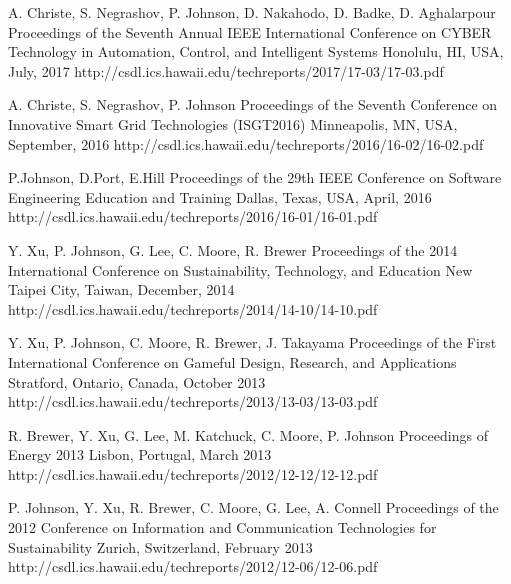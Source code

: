 \documentclass[11pt,letterpaper,sans]{moderncv} %
\begin{document}
          {A. Christe, S. Negrashov, P. Johnson, D. Nakahodo, D. Badke, D. Aghalarpour}
          {Proceedings of the Seventh Annual IEEE International Conference on CYBER Technology in Automation, Control, and Intelligent Systems}
          {Honolulu, HI, USA, July, 2017}
          {http://csdl.ics.hawaii.edu/techreports/2017/17-03/17-03.pdf}

          {A. Christe, S. Negrashov, P. Johnson}
          {Proceedings of the Seventh Conference on Innovative Smart Grid Technologies (ISGT2016)}
          {Minneapolis, MN, USA, September, 2016}
          {http://csdl.ics.hawaii.edu/techreports/2016/16-02/16-02.pdf}

          {P.Johnson, D.Port, E.Hill}
          {Proceedings of the 29th IEEE Conference on Software Engineering Education and Training}
          {Dallas, Texas, USA, April, 2016}
          {http://csdl.ics.hawaii.edu/techreports/2016/16-01/16-01.pdf}


          {Y. Xu, P. Johnson, G. Lee, C. Moore, R. Brewer}
          {Proceedings of the 2014 International Conference on Sustainability, Technology, and Education}
          {New Taipei City, Taiwan, December, 2014}
          {http://csdl.ics.hawaii.edu/techreports/2014/14-10/14-10.pdf}

          {Y. Xu, P. Johnson, C. Moore, R. Brewer, J. Takayama}
          {Proceedings of the First International Conference on Gameful Design, Research, and Applications}
          {Stratford, Ontario, Canada, October 2013}
          {http://csdl.ics.hawaii.edu/techreports/2013/13-03/13-03.pdf}

          {R. Brewer, Y. Xu, G. Lee, M. Katchuck, C. Moore, P. Johnson}
          {Proceedings of Energy 2013}
          {Lisbon, Portugal, March 2013}
          {http://csdl.ics.hawaii.edu/techreports/2012/12-12/12-12.pdf}

          {P. Johnson, Y. Xu, R. Brewer,  C. Moore,  G. Lee, A. Connell}
          {Proceedings of the 2012 Conference on Information and Communication Technologies for Sustainability}
          {Zurich, Switzerland, February 2013}
          {http://csdl.ics.hawaii.edu/techreports/2012/12-06/12-06.pdf}
\end{document}
